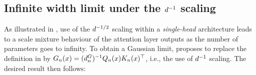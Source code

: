 \documentclass{article}
\begin{document}
\subsection{Infinite width limit under the $d^{-1}$ scaling}\label{sect:linear_scaling}

As illustrated in , use of the $d^{-1/2}$ scaling within a \emph{single-head} architecture leads to a scale mixture behaviour of the attention layer outputs as the number of parameters goes to infinity.
To obtain a Gaussian limit, \citet[appendix A]{yang2019v2} proposes to replace the definition in  by 
$
\logitSymbol_{\sequenceVariable} %
(\inputSymbol) 
= 
(\genericDimenstion_{\sequenceVariable}^{\logitSymbol})^{-1}
\querySymbol_{\sequenceVariable} %
(\inputSymbol) 
\keySymbol_{\sequenceVariable} %
(\inputSymbol)^\top 
$,
i.e., the use of $d^{-1}$ scaling.
The desired result then follows:
\end{document}
